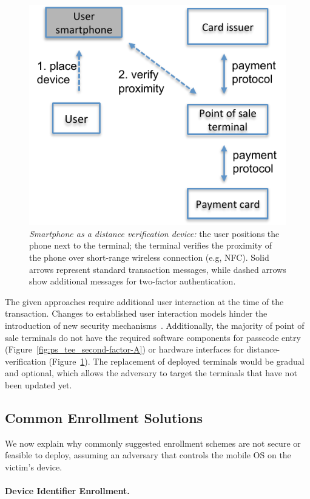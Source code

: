 \begin{figure}[!ht]
  \centering
  \includegraphics[width=.5\linewidth]{figures/phonesecures/tee_second-factor-C}
  \caption[Smartphone as a distance verification device]{\emph{Smartphone as a distance verification device:}  the user positions the phone next to the terminal; the terminal verifies the proximity of the phone over short-range wireless connection (e.g, NFC). Solid arrows represent
  standard transaction messages, while dashed arrows show additional messages
  for two-factor authentication.}
  \label{fig:ps_tee_second-factor-C}
\end{figure}

The given approaches require additional user interaction at the time of the
transaction. Changes to established user interaction models hinder the
introduction of new security mechanisms~\cite{bonneau12sp}. Additionally, the
majority of point of sale terminals do not have the required software
components for passcode entry (Figure~\ref{fig:ps_tee_second-factor-A}) or
hardware interfaces for distance-verification
(Figure~\ref{fig:ps_tee_second-factor-C}). The replacement of deployed
terminals would be gradual and optional, which allows the adversary to target
the terminals that have not been updated yet.

\subsection{Common Enrollment Solutions}
\label{sec:ps_tee_straightforward}

We now explain why commonly suggested enrollment schemes are not secure or
feasible to deploy, assuming an adversary that controls the mobile OS on the
victim's device.

\paragraph{Device Identifier Enrollment.}

